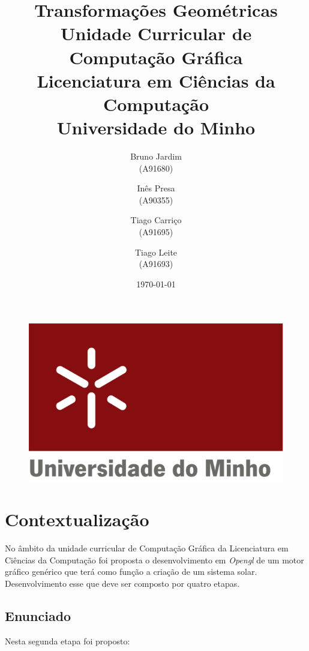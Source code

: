 \documentclass[11pt,a4paper]{report}
\begin{document}
\begin{figure}
    \includegraphics[scale=0.3]{logoum.png}
\end{figure}
\title{\textbf{Transformações Geométricas}\\
       \textbf{Unidade Curricular de Computação Gráfica}\\ Licenciatura em Ciências da Computação\\Universidade do Minho
       } %
\author{Bruno Jardim\\ (A91680) \and Inês Presa\\ (A90355)
         \and Tiago Carriço\\ (A91695) \and Tiago Leite\\ (A91693)
       } %
\date{\today} %
\maketitle
\begingroup
\renewcommand*\contentsname{Índice}
\let\clearpage\relax
\tableofcontents


\endgroup
\newpage

\chapter{Contextualização}    
No âmbito da unidade curricular de Computação Gráfica da Licenciatura em Ciências da Computação foi proposta o desenvolvimento em \textit{Opengl} de um motor gráfico genérico que terá como função a criação de um sistema solar. Desenvolvimento esse que deve ser composto por quatro etapas. 

\section{Enunciado}
Nesta segunda etapa foi proposto:
\end{document}
